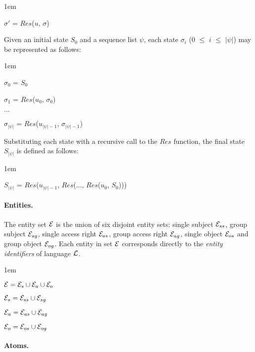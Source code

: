 \documentclass[global,twocolumn,final]{svjour}
\newenvironment{vquote}
  {\begin{list}{}{\leftmargin 1em}\item[]}
  {\end{list}}
\begin{document}
        \begin{vquote}
          $\sigma'$ = $Res$($u$, $\sigma$)
        \end{vquote}

        Given an initial state $S_{0}$ and a sequence list $\psi$, each state
        $\sigma_{i}$ ($0$ $\leq$ $i$ $\leq$ $|\psi|$) may be represented as
        follows:

        \begin{vquote}
          $\sigma_{0}$ = $S_{0}$

          $\sigma_{1}$ = $Res$($u_{0}$, $\sigma_{0}$)

          $\ldots$

          $\sigma_{|\psi|}$ = $Res$($u_{|\psi| - 1}$, $\sigma_{|\psi| - 1}$)
        \end{vquote}

        Substituting each state with a recursive call to the $Res$ function,
        the final state $S_{|\psi|}$ is defined as follows:

        \begin{vquote}
          $S_{|\psi|}$ = $Res$($u_{|\psi| - 1}$, $Res$($\ldots$, $Res$($u_{0}$, $S_{0}$)))
        \end{vquote}

        \paragraph{Entities.}

          The entity set ${\cal E}$ is the union of six disjoint entity sets:
          single subject ${\cal E}_{ss}$, group subject ${\cal E}_{sg}$,
          single access right ${\cal E}_{as}$, group access right
          ${\cal E}_{ag}$, single object ${\cal E}_{os}$ and group object
          ${\cal E}_{og}$. Each entity in set ${\cal E}$ corresponds directly
          to the {\em entity identifiers} of language ${\cal L}$.

          \begin{vquote}
            ${\cal E} = {\cal E}_{s} \cup {\cal E}_{a} \cup {\cal E}_{o}$

            ${\cal E}_{s} = {\cal E}_{ss} \cup {\cal E}_{sg}$

            ${\cal E}_{a} = {\cal E}_{as} \cup {\cal E}_{ag}$

            ${\cal E}_{o} = {\cal E}_{os} \cup {\cal E}_{og}$
          \end{vquote}

        \paragraph{Atoms.}
\end{document}

